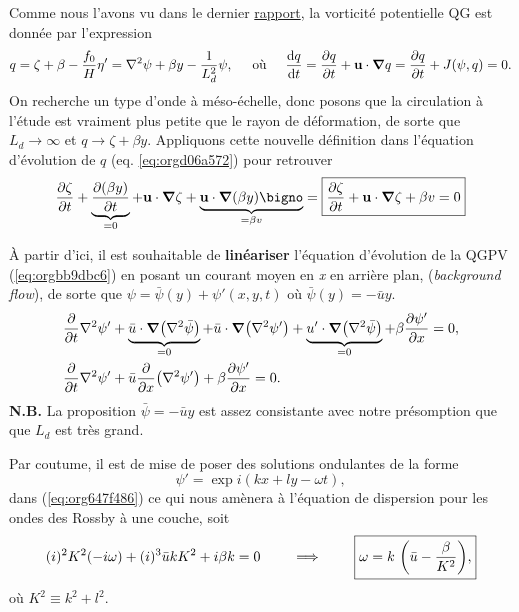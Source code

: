 \documentclass[10pt]{article}
\numberwithin{equation}{section}
\begin{document}
Comme nous l'avons vu dans le dernier \href{rapport-2023-03-24.org}{rapport}, la vorticité potentielle QG est donnée par l'expression
\begin{equation}
\label{eq:orgd06a572}
q = \zeta + \beta - \frac{f_0}{H} \eta' = \laplacian \psi + \beta y - \frac{1}{L_d^2} \psi,
\hspace{0.5cm}\text{où}\hspace{0.5cm}
\dv{q}{t} = \pdv{q}{t} + \vb{u} \cdot \gradient q = \pdv{q}{t} + J(\psi,q) =  0.
\end{equation}
On recherche un type d'onde à méso-échelle, donc posons que la circulation à l'étude est vraiment plus petite que le rayon de déformation, de sorte que \(L_d \rightarrow \infty\) et \(q \rightarrow \zeta + \beta y\).
Appliquons cette nouvelle définition dans l'équation d'évolution de \(q\) (eq. \ref{eq:orgd06a572}) pour retrouver
\begin{equation}
\label{eq:orgbb9dbc6}
\pdv{\zeta}{t} + \underbrace{\pdv{(\beta y)}{t}}_{=0} + \vb{u}\cdot \gradient \zeta + \underbrace{\vb{u} \cdot \gradient(\beta y)\bigno}_{ =\beta v}
= \boxed{
\pdv{\zeta}{t} + \vb{u}\cdot\gradient\zeta  + \beta v = 0
}
\end{equation}

À partir d'ici, il est souhaitable de \textbf{linéariser} l'équation d'évolution de la QGPV (\ref{eq:orgbb9dbc6}) en posant un courant moyen  en \emph{x} en arrière plan, (\emph{background flow}), de sorte que \(\psi = \bar{\psi}(y) + \psi'(x,y,t)\) où \(\bar{\psi}(y)=-\bar{u}y\).
\begin{align}
\label{eq:org647f486}
&\pdv{t} \laplacian \psi' + \underbrace{\bar{u}\cdot \gradient (\laplacian \bar{\psi}) }_{=0}
+ \bar{u}\cdot \gradient (\laplacian \psi')
+ \underbrace{u'\cdot \gradient (\laplacian \bar{\psi}) }_{=0}
+ \beta \pdv{\psi'}{x} = 0,\nonumber \\
%
&\pdv{t} \laplacian \psi' + \bar{u}\pdv{x} (\laplacian \psi') + \beta \pdv{\psi'}{x} = 0.
\end{align}
\textbf{N.B.} La proposition \(\bar{\psi} = -\bar{u} y\) est assez consistante avec notre présomption que que \(L_d\) est très grand. \bigskip

Par coutume, il est de mise de poser des solutions ondulantes de la forme
\begin{equation}
\psi' = \exp{i(kx + ly -\omega t)},
\end{equation}
dans (\ref{eq:org647f486}) ce qui nous amènera à l'équation de dispersion pour les ondes des Rossby à une couche, soit
\begin{equation}
(i)^2 K^2(-i\omega) + (i)^3\bar{u} k K^2 + i \beta k = 0
\hspace{0.8cm}\Longrightarrow\hspace{0.8cm}
\boxed{\omega = k \ \qty(\bar{u} - \frac{\beta}{K^2}),}
\end{equation}
où \(K^2 \equiv k^2 + l^2\).\bigskip
\end{document}
